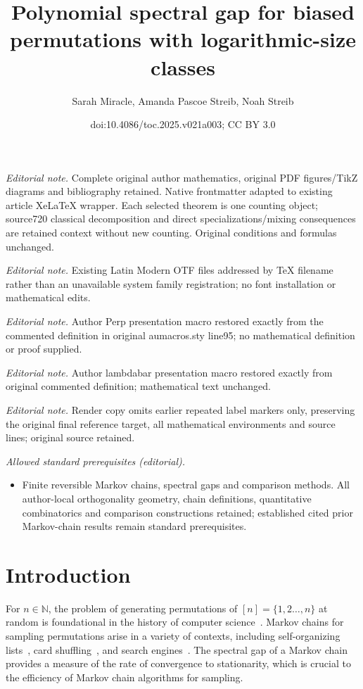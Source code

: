 \documentclass[11pt]{article}
\title{Polynomial spectral gap for biased permutations with logarithmic-size classes}
\author{Sarah Miracle, Amanda Pascoe Streib, Noah Streib}
\date{doi:10.4086/toc.2025.v021a003; CC BY 3.0}
\begin{document}
\maketitle
\noindent\textit{Editorial note.} Complete original author mathematics, original PDF figures/TikZ diagrams and bibliography retained. Native frontmatter adapted to existing article XeLaTeX wrapper. Each selected theorem is one counting object; source720 classical decomposition and direct specializations/mixing consequences are retained context without new counting. Original conditions and formulas unchanged.\par\medskip
\noindent\textit{Editorial note.} Existing Latin Modern OTF files addressed by TeX filename rather than an unavailable system family registration; no font installation or mathematical edits.\par\medskip
\noindent\textit{Editorial note.} Author Perp presentation macro restored exactly from the commented definition in original aumacros.sty line95; no mathematical definition or proof supplied.\par\medskip
\noindent\textit{Editorial note.} Author lambdabar presentation macro restored exactly from original commented definition; mathematical text unchanged.\par\medskip
\noindent\textit{Editorial note.} Render copy omits earlier repeated label markers only, preserving the original final reference target, all mathematical environments and source lines; original source retained.\par\medskip
\noindent\textit{Allowed standard prerequisites (editorial).}\begin{itemize}
\item Finite reversible Markov chains, spectral gaps and comparison methods. All author-local orthogonality geometry, chain definitions, quantitative combinatorics and comparison constructions retained; established cited prior Markov-chain results remain standard prerequisites.
\end{itemize}\medskip
\section{Introduction}\label{sec:intro}

For $n\in\mathbb{N}$, the problem of generating permutations of 
$[n]=\{1,2\dots,n\}$ at random is foundational in the history of 
computer science~\cite{knuth2}. Markov chains for sampling permutations 
arise in a variety of contexts, including self-organizing 
lists~\cite{selforganizingsurvey, rivest}, card shuffling~\cite{bd, 
wilson}, and search engines~\cite{search}. The spectral gap of a Markov 
chain provides a measure of the rate of convergence to stationarity, 
which is crucial to the efficiency of Markov chain algorithms for 
sampling.
\end{document}
